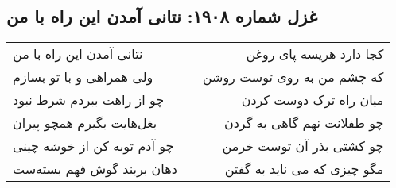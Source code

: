 \begin{center}
\section*{غزل شماره ۱۹۰۸: نتانی آمدن این راه با من}
\label{sec:1908}
\begin{longtable}{l p{0.5cm} r}
نتانی آمدن این راه با من
&&
کجا دارد هریسه پای روغن
\\
ولی همراهی و با تو بسازم
&&
که چشم من به روی توست روشن
\\
چو از راهت ببردم شرط نبود
&&
میان راه ترک دوست کردن
\\
بغل‌هایت بگیرم همچو پیران
&&
چو طفلانت نهم گاهی به گردن
\\
چو آدم توبه کن از خوشه چینی
&&
چو کشتی بذر آن توست خرمن
\\
دهان بربند گوش فهم بسته‌ست
&&
مگو چیزی که می ناید به گفتن
\\
\end{longtable}
\end{center}
